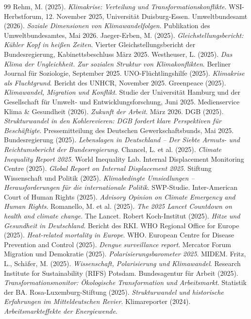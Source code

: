 \documentclass[12pt, a4paper]{article}
\begin{document}
	\newpage
	\begin{thebibliography}{99}
		 Rehm, M. (2025). \textit{Klimakrise: Verteilung und Transformationskonflikte}. WSI-Herbstforum, 12. November 2025, Universität Duisburg-Essen.
		 Umweltbundesamt (2026). \textit{Soziale Dimensionen von Klimawandelfolgen}. Publikation des Umweltbundesamtes, Mai 2026.
		 Jaeger-Erben, M. (2025). \textit{Gleichstellungsbericht: Kühler Kopf in heißen Zeiten}. Vierter Gleichstellungsbericht der Bundesregierung, Kabinettsbeschluss März 2025.
		 Westheuser, L. (2025). \textit{Das Klima der Ungleichheit. Zur sozialen Struktur von Klimakonflikten}. Berliner Journal für Soziologie, September 2025.
		 UNO-Flüchtlingshilfe (2025). \textit{Klimakrise als Fluchtgrund}. Bericht des UNHCR, November 2025.
		 Greenpeace (2025). \textit{Klimawandel, Migration und Konflikt}. Studie der Universität Hamburg und der Gesellschaft für Umwelt- und Entwicklungsforschung, Juni 2025.
		 Medienservice Klima \& Gesundheit (2026). \textit{Zukunft der Arbeit}. März 2026.
		 DGB (2025). \textit{Strukturwandel in den Kohlerevieren: DGB fordert klare Perspektiven für Beschäftigte}. Pressemitteilung des Deutschen Gewerkschaftsbunds, Mai 2025.
		 Bundesregierung (2025). \textit{Lebenslagen in Deutschland – Der Siebte Armuts- und Reichtumsbericht der Bundesregierung}.
		 Chancel, L. et al. (2025). \textit{Climate Inequality Report 2025}. World Inequality Lab.
		 Internal Displacement Monitoring Centre (2025). \textit{Global Report on Internal Displacement 2025}.
		 Stiftung Wissenschaft und Politik (2025). \textit{Klimabedingte Umsiedlungen – Herausforderungen für die internationale Politik}. SWP-Studie.
		 Inter-American Court of Human Rights (2025). \textit{Advisory Opinion on Climate Emergency and Human Rights}.
		 Romanello, M. et al. (2025). \textit{The 2025 Lancet Countdown on health and climate change}. The Lancet.
		 Robert Koch-Institut (2025). \textit{Hitze und Gesundheit in Deutschland}. Bericht des RKI.
		 WHO Regional Office for Europe (2025). \textit{Heat-related mortality in Europe}. WHO.
		 European Centre for Disease Prevention and Control (2025). \textit{Dengue surveillance report}.
		 Mercator Forum Migration und Demokratie (2025). \textit{Polarisierungsbarometer 2025}. MIDEM.
		 Fritz, L., Schäfer, M. (2025). \textit{Wissenschaft, Polarisierung und Klimawandel}. Research Institute for Sustainability (RIFS) Potsdam.
		 Bundesagentur für Arbeit (2025). \textit{Transformationsmonitor: Ökologische Transformation und Arbeitsmarkt}. Statistik der BA.
		 Rosa-Luxemburg-Stiftung (2025). \textit{Strukturwandel und historische Erfahrungen im Mitteldeutschen Revier}.
		 Klimareporter (2024). \textit{Arbeitsmarkteffekte der Energiewende}.
		

\end{thebibliography}
\end{document}
